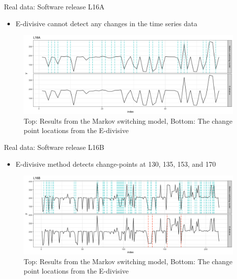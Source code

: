 \documentclass{beamer}
\begin{document}
\begin{frame}
Real data: Software release L16A

\begin{itemize}
	\item E-divisive cannot detect any changes in the time series data
\end{itemize}

\begin{figure}
	\includegraphics[width=1\linewidth]{compare_L16A}
	\caption{Top: Results from the Markov switching model, Bottom: The change point locations from the E-divisive}
\end{figure}

\end{frame}
\begin{frame}
Real data: Software release L16B

\begin{itemize}
	\item E-divisive method detects change-points at 130, 135, 153, and 170
\end{itemize}

\begin{figure}
	\includegraphics[width=1\linewidth]{compare_L16B}
	\caption{Top: Results from the Markov switching model, Bottom: The change point locations from the E-divisive}
\end{figure}

\end{frame}
\end{document}

